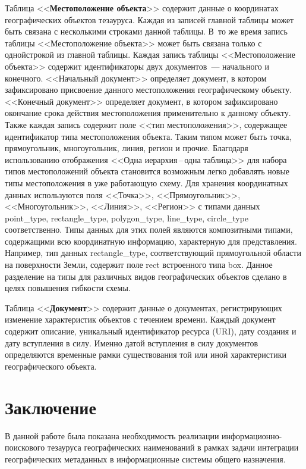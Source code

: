 \begin{multicols}{2}
  Таблица <<\textbf{Местоположение объекта}>> содержит данные о координатах 
географических объектов тезауруса. Каж\-дая из записей главной таблицы может быть 
связана с несколькими строками данной таб\-ли\-цы. В~то же время запись таб\-ли\-цы 
<<Местоположение объекта>> может быть связана только с одной\linebreak строкой из главной 
таблицы. Каждая запись таб\-ли\-цы <<Местоположение объекта>> содержит идентификаторы 
двух документов~--- начального и конечного. <<Начальный документ>> определяет\linebreak 
документ, в котором зафиксировано присвоение данного мес\-то\-по\-ло\-же\-ния географическому 
объекту. <<Конечный документ>> определяет документ, в котором зафиксировано 
окончание срока действия местоположения применительно к данному объекту. Также 
каждая запись содержит поле <<тип местоположения>>, содержащее идентификатор типа 
местоположения объекта. Таким типом может быть точка, прямоугольник, многоугольник, 
линия, регион и прочие. Благодаря использованию отображения <<Одна ие\-рар\-хия\,--\,од\-на 
таблица>> для набора типов местоположений объекта становится возможным легко 
добавлять новые типы местоположения в уже работающую схему. Для хранения 
координатных данных используются поля <<Точка>>, <<Прямоугольник>>, 
<<Многоугольник>>, <<Линия>>, <<Регион>> с типами данных {point\_type}, 
{rectangle\_type}, {polygon\_type}, {line\_type}, {circle\_type} соответственно. 
Типы данных для этих полей являются композитными типами, содержащими всю 
координатную информацию, характерную для представления. Например, тип данных 
{rectangle\_type}, соответствующий прямоугольной области на поверхности Земли, 
содержит поле {rect} встроенного типа {box}. Данное разделение на типы для 
различных видов географических объектов сделано в целях повышения гибкости схемы.
  
  Таблица <<\textbf{Документ}>> содержит данные о документах, регистрирующих 
изменение характеристик объектов с течением времени. Каждый документ содержит 
описание, уникальный идентификатор ресурса ({URI}), дату создания и дату вступления 
в силу. Именно датой вступления в силу документов определяются временные рамки 
существования той или иной характеристики географического объекта.
  
  \section{Заключение}
  
  В данной работе была показана необходимость реализации информационно-поискового 
тезауруса географических наименований в рамках задачи интеграции географических 
метаданных в информационные системы общего назначения.
  

\end{multicols}

